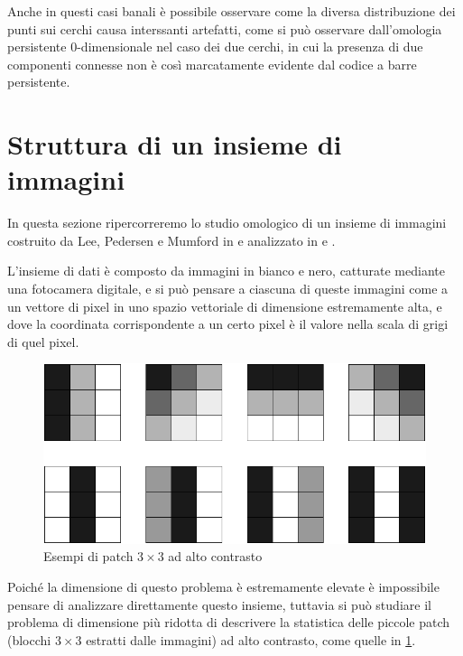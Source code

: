 Anche in questi casi banali è possibile osservare come la diversa distribuzione dei punti sui cerchi causa interssanti artefatti, come si può osservare dall'omologia persistente 0-dimensionale nel caso dei due cerchi, in cui la presenza di due componenti connesse non è così marcatamente evidente dal codice a barre persistente.


\section{Struttura di un insieme di immagini}

In questa sezione ripercorreremo lo studio omologico di un insieme di immagini costruito da
Lee, Pedersen e Mumford in \cite{Lee2003} e analizzato in \cite{Carlsson2008} e \cite{DeSilva2004}.

L'insieme di dati è composto da immagini in bianco e nero, catturate mediante una fotocamera digitale, e si può pensare a ciascuna di queste immagini come a un vettore di pixel in uno spazio vettoriale di dimensione estremamente alta, e dove la coordinata corrispondente a un certo pixel è il valore nella scala di grigi di quel pixel.

\begin{figure}[ht]
  \begin{center}
    \includegraphics[width=.8\linewidth]{gfx/example_patches.pdf}
    \caption{Esempi di patch $3\times 3$ ad alto contrasto}
    \label{fig:examplepatches}
  \end{center}
\end{figure}

Poiché la dimensione di questo problema è estremamente elevate è impossibile pensare di analizzare direttamente questo insieme, tuttavia si può studiare il problema di dimensione più ridotta di descrivere la statistica delle piccole patch (blocchi $3\times 3$ estratti dalle immagini) ad alto contrasto, come quelle in \cref{fig:examplepatches}.

